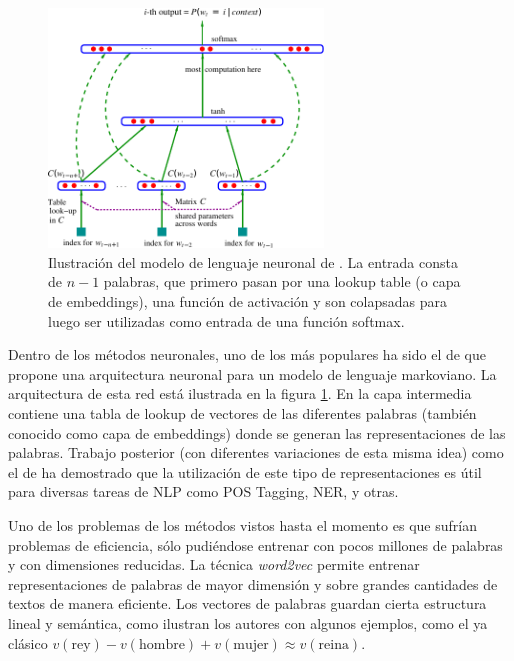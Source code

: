 \begin{figure}
    \centering
    \includegraphics[width=0.65\textwidth]{img/02/bengio_neural_language_model.pdf}
    \caption{Ilustración del modelo de lenguaje neuronal de \citet{bengio2003neural}. La entrada consta de $n-1$ palabras, que primero pasan por una lookup table (o capa de embeddings), una función de activación y son colapsadas para luego ser utilizadas como entrada de una función softmax.}
    \label{fig:bengio_neural_language_model}

\end{figure}

Dentro de los métodos neuronales, uno de los más populares ha sido el de \citet{bengio2003neural} que propone una arquitectura neuronal para un modelo de lenguaje markoviano. La arquitectura de esta red está ilustrada en la figura \ref{fig:bengio_neural_language_model}. En la capa intermedia contiene una tabla de lookup de vectores de las diferentes palabras (también conocido como capa de embeddings) donde se generan las representaciones de las palabras. Trabajo posterior (con diferentes variaciones de esta misma idea) como el de \citet{collobert2011natural} ha demostrado que la utilización de este tipo de representaciones es útil para diversas tareas de NLP como POS Tagging, NER, y otras.

Uno de los problemas de los métodos vistos hasta el momento es que sufrían problemas de eficiencia, sólo pudiéndose entrenar con pocos millones de palabras y con dimensiones reducidas. La técnica \emph{word2vec} \cite{mikolov2013efficient} permite entrenar representaciones de palabras de mayor dimensión y sobre grandes cantidades de textos de manera eficiente. Los vectores de palabras guardan cierta estructura lineal y semántica, como ilustran los autores con algunos ejemplos, como el ya clásico $v(\text{rey}) - v(\text{hombre}) + v(\text{mujer}) \approx v(\text{reina})$.

